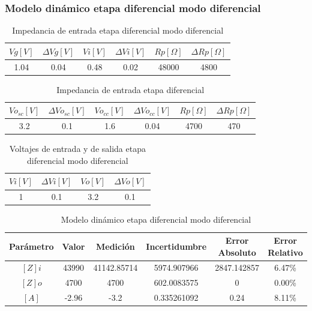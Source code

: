 \subsubsection{Modelo dinámico etapa diferencial modo diferencial}

\begin{table}[h!]
\centering
\begin{tabular}{|c|c|c|c|c|c|}
\hline
\textbf{\(Vg[V]\)} & \textbf{\(\varDelta Vg[V]\)} & \textbf{\(Vi[V]\)} & \textbf{\(\varDelta Vi[V]\)} & \textbf{\(Rp[\Omega]\)} & \textbf{\(\varDelta Rp[\Omega]\)} \\ \hline
1.04 & 0.04 & 0.48 & 0.02 & 48000 & 4800 \\ \hline
\end{tabular}
\caption{Impedancia de entrada etapa diferencial modo diferencial}
\label{tab:med-impedancia-entrada-etapa-diferencial modo diferencial}
\end{table}

\begin{table}[h!]
\centering
\begin{tabular}{|c|c|c|c|c|c|}
\hline
\textbf{\(Vo_{sc}[V]\)} & \textbf{\(\varDelta Vo_{sc}[V]\)} & \textbf{\(Vo_{cc}[V]\)} & \textbf{\(\varDelta Vo_{cc}[V]\)} & \textbf{\(Rp[\Omega]\)} & \textbf{\(\varDelta Rp[\Omega]\)} \\ \hline
3.2 & 0.1 & 1.6 & 0.04 & 4700 & 470 \\ \hline
\end{tabular}
\caption{Impedancia de entrada etapa diferencial}
\label{tab:med-impedancia-entrada-etapa-diferencial}
\end{table}

\begin{table}[h!]
\centering
\begin{tabular}{|c|c|c|c|}
\hline
\textbf{\(Vi[V]\)} & \textbf{\(\varDelta Vi[V]\)} & \textbf{\(Vo[V]\)} & \textbf{\(\varDelta Vo[V]\)} \\ \hline
1 & 0.1 & 3.2 & 0.1 \\ \hline
\end{tabular}
\caption{Voltajes de entrada y de salida etapa diferencial modo diferencial}
\label{tab:med-voltaje-entrada-salida-etapa-diferencial}
\end{table}

\begin{table}[h!]
\centering
\begin{tabular}{|c|c|c|c|c|c|}
\hline
\textbf{Parámetro} & \textbf{Valor} & \textbf{Medición} & \textbf{Incertidumbre} & \textbf{Error Absoluto} & \textbf{Error Relativo} \\ \hline
$[Z] i$ & 43990 & 41142.85714 & 5974.907966 & 2847.142857 & 6.47\% \\ \hline
$[Z] o$ & 4700 & 4700 & 602.0083575 & 0 & 0.00\% \\ \hline
$[A]$ & -2.96 & -3.2 & 0.335261092 & 0.24 & 8.11\% \\ \hline
\end{tabular}
\caption{Modelo dinámico etapa diferencial modo diferencial}
\label{tab:med-modelo-dinamico-etapa-diferencial-modo-diferencial}
\end{table}

